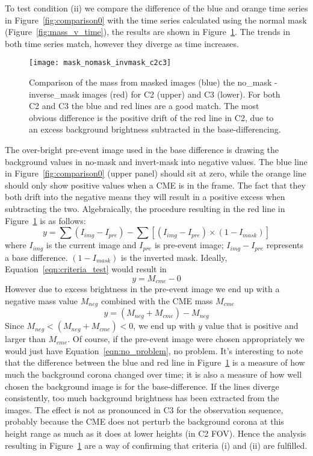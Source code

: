 To test condition (ii) we compare the difference of the blue and orange time series in Figure~\ref{fig:comparison0} with the time series calculated using the normal mask (Figure~\ref{fig:mass_v_time}), the results are shown in Figure~\ref{fig:comparison}. The trends in both time series match, however they diverge as time increases. 
\begin{figure}[t!]
\begin{center}
\texttt{[image: mask\_nomask\_invmask\_c2c3]}
\caption[Mass time series error check]{Comparison of the mass from masked images (blue) the no\_mask - inverse\_mask images (red) for C2 (upper) and C3 (lower). For both C2 and C3 the blue and red lines are a good match. The most obvious difference is the positive drift of the red line in C2, due to an excess background brightness subtracted in the base-differencing.}
\label{fig:comparison}
\end{center}
\end{figure}
The over-bright pre-event image used in the base difference is drawing the background values in no-mask and invert-mask into negative values. The blue line in Figure~\ref{fig:comparison0} (upper panel) should sit at zero, while the orange line should only show positive values when a CME is in the frame. The fact that they both drift into the negative means they will result in a positive excess when subtracting the two.
Algebraically, the procedure resulting in the red line in Figure~\ref{fig:comparison} is as follows:
\begin{equation}
y = \sum(I_{img} - I_{pre}) - \sum[(I_{img} - I_{pre})\times (1-I_{mask})]
\label{eqn:criteria_test}
\end{equation}
where $I_{img}$ is the current image and $I_{pre}$ is pre-event image; $I_{img} - I_{pre}$ represents a base difference. $(1-I_{mask})$ is the inverted mask. Ideally, Equation~\ref{eqn:criteria_test} would result in
\begin{equation}
y = M_{cme} - 0
\label{eqn:no_problem}
\end{equation}
However due to excess brightness in the pre-event image we end up with a negative mass value $M_{neg}$ combined with the CME mass $M_{cme}$
\begin{equation}
y = (M_{neg} + M_{cme})  - M_{neg}
\end{equation}
Since $M_{neg} < (M_{neg} + M_{cme}   ) < 0$, we end up with $y$ value that is positive and larger than $M_{cme}$. Of course, if the pre-event image were chosen appropriately we would just have Equation~\ref{eqn:no_problem}, no problem. It's interesting to note that the difference between the blue and red line in Figure~\ref{fig:comparison} is a measure of how much the background corona changed over time; it is also a measure of how well chosen the background image is for the base-difference. If the lines diverge consistently, too much background brightness has been extracted from the images. The effect is not as pronounced in C3 for the observation sequence, probably because the CME does not perturb the background corona at this height range as much as it does at lower heights (in C2 FOV). Hence the analysis resulting in Figure~\ref{fig:comparison} are a way of confirming that criteria (i) and (ii) are fulfilled.

